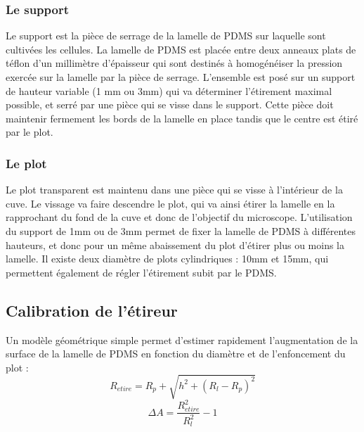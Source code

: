 \documentclass{report}
\begin{document}
		
	\subsubsection{Le support}
	Le support est la pièce de serrage de la lamelle de PDMS sur laquelle sont cultivées les cellules. La lamelle de PDMS est placée entre deux anneaux plats de téflon d'un millimètre d'épaisseur qui sont destinés à homogénéiser la pression exercée sur la lamelle par la pièce de serrage. L'ensemble est posé sur un support de hauteur variable (1 mm ou 3mm) qui va déterminer l'étirement maximal possible, et serré par une pièce qui se visse dans le support. 
	Cette pièce doit maintenir fermement les bords de la lamelle en place tandis que le centre est étiré par le plot. 
	\subsubsection{Le plot}
	Le plot transparent est maintenu dans une pièce qui se visse à l'intérieur de la cuve. Le vissage va faire descendre le plot, qui va ainsi étirer la lamelle en la rapprochant du fond de la cuve et donc de l'objectif du microscope. 
	L'utilisation du support de 1mm ou de 3mm permet de fixer la lamelle de PDMS à différentes hauteurs, et donc pour un même abaissement du plot d'étirer plus ou moins la lamelle. Il existe deux diamètre de plots cylindriques : 10mm et 15mm, qui permettent également de régler l'étirement subit par le PDMS. 
	\subsection{Calibration de l'étireur}
	
	Un modèle géométrique simple permet d'estimer rapidement l'augmentation de la surface de la lamelle de PDMS en fonction du diamètre et de l'enfoncement du plot : 
	$$R_{etire}=R_p+\sqrt{h^2+(R_l-R_p)^2}$$
	$$ \Delta A = \frac{R_{etire}^2}{R_l^2}-1$$ 	
		
\end{document}
